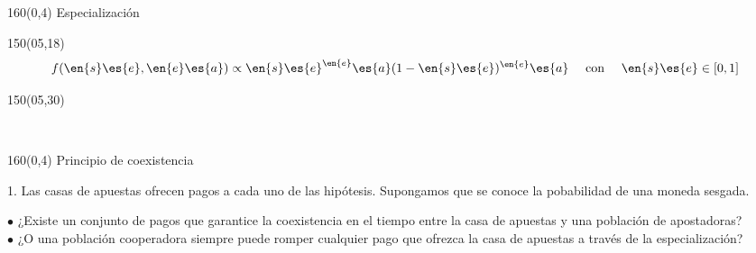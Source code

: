 \documentclass[shownotes,aspectratio=169]{beamer}
\newcommand{\Ee}{\en{s}\es{e}}
\newcommand{\Aa}{\en{e}\es{a}}
\begin{document}
\begin{frame}[plain]
\begin{textblock}{160}(0,4)
 \centering \LARGE
 Especialización
\end{textblock}
\vspace{1cm}

\begin{textblock}{150}(05,18)
\begin{equation*}
f(\Ee,\Aa) \propto \Ee^\Aa(1-\Ee)^\Aa \text{  \ \ \  con \ \ \  } \Ee \in [0,1]
\end{equation*}
\end{textblock}


\begin{textblock}{150}(05,30)
\begin{figure}[H]
    \centering
    \begin{subfigure}[b]{0.49\linewidth}
    \end{subfigure}
    \ 
    \begin{subfigure}[b]{0.49\linewidth}
    \end{subfigure}
    \label{fig:tasa-temporal-2}
\end{figure}
\end{textblock}
\end{frame}


\begin{frame}[plain]
\begin{textblock}{160}(0,4)
 \centering \LARGE Principio de coexistencia
\end{textblock}
\vspace{1cm}

\normalsize

1. Las casas de apuestas ofrecen pagos a cada uno de las hipótesis.
Supongamos que se conoce la pobabilidad de una moneda sesgada.

\vspace{0.3cm}

$\bullet$ ¿Existe un conjunto de pagos que garantice la coexistencia en el tiempo entre la casa de apuestas y una población de apostadoras? \\
$\bullet$ ¿O una población cooperadora siempre puede romper cualquier pago que ofrezca la casa de apuestas a través de la especialización?

\end{frame}
\end{document}
